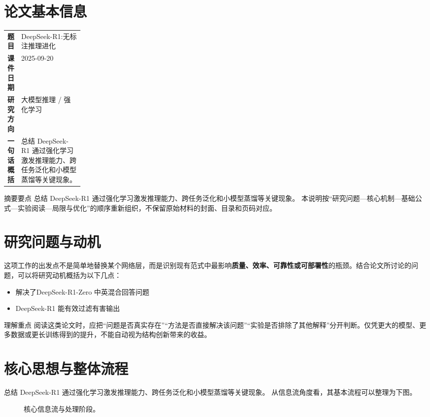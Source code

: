 \documentclass[UTF8,11pt,a4paper]{ctexart}
\newcommand{\term}[1]{\textbf{\textcolor{mainblue}{#1}}}
\begin{document}
\section{论文基本信息}
\begin{center}
\begin{tabularx}{0.94\linewidth}{>{\bfseries}p{0.18\linewidth}X}
\toprule
题目 & DeepSeek-R1:无标注推理进化\\
课件日期 & 2025-09-20\\
研究方向 & 大模型推理 / 强化学习\\
一句话概括 & 总结 DeepSeek-R1 通过强化学习激发推理能力、跨任务泛化和小模型蒸馏等关键现象。\\
\bottomrule
\end{tabularx}
\end{center}

\begin{infobox}{摘要要点}
总结 DeepSeek-R1 通过强化学习激发推理能力、跨任务泛化和小模型蒸馏等关键现象。 本说明按“研究问题—核心机制—基础公式—实验阅读—局限与优化”的顺序重新组织，不保留原始材料的封面、目录和页码对应。
\end{infobox}

\section{研究问题与动机}
这项工作的出发点不是简单地替换某个网络层，而是识别现有范式中最影响\term{质量、效率、可靠性或可部署性}的瓶颈。结合论文所讨论的问题，可以将研究动机概括为以下几点：
\begin{itemize}
\item 解决了DeepSeek-R1-Zero 中英混合回答问题
\item DeepSeek-R1 能有效过滤有害输出
\end{itemize}

\begin{notebox}{理解重点}
阅读这类论文时，应把“问题是否真实存在”“方法是否直接解决该问题”“实验是否排除了其他解释”分开判断。仅凭更大的模型、更多数据或更长训练得到的提升，不能自动视为结构创新带来的收益。
\end{notebox}

\section{核心思想与整体流程}
总结 DeepSeek-R1 通过强化学习激发推理能力、跨任务泛化和小模型蒸馏等关键现象。 从信息流角度看，其基本流程可以整理为下图。

\begin{figure}[H]
\centering
{}
\caption{核心信息流与处理阶段。}
\end{figure}
\end{document}
